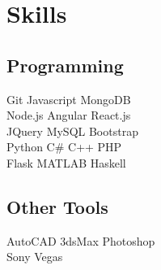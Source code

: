 \documentclass[a4paper]{resume}
\begin{document}
\begin{minipage}[t]{0.33\textwidth}
\sectionspace %



\section{Skills}

\subsection{Programming}

Git \textbullet{} Javascript \textbullet{} MongoDB \\
Node.js \textbullet{} Angular \textbullet{} React.js \\
JQuery \textbullet{} MySQL \textbullet{} Bootstrap \\
Python \textbullet{} C\# \textbullet{} C++ \textbullet{} PHP \\
Flask \textbullet{} MATLAB \textbullet{} Haskell \\

\sectionspace %

\subsection{Other Tools}
AutoCAD \textbullet{} 3dsMax \textbullet{} Photoshop \\
Sony Vegas


\end{minipage} %
\hfill
%
%
\end{document}
